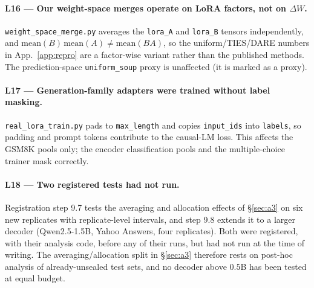 \documentclass[11pt]{article}
\begin{document}
\paragraph{L16 — Our weight-space merges operate on LoRA factors, not on $\Delta W$.} \texttt{weight\_\allowbreak space\_\allowbreak merge.\allowbreak py} averages the \texttt{lora\_A} and \texttt{lora\_B} tensors independently, and $\mathrm{mean}(B)\,\mathrm{mean}(A) \neq \mathrm{mean}(BA)$, so the uniform/TIES/DARE numbers in App.~\ref{app:repro} are a factor-wise variant rather than the published methods. The prediction-space \texttt{uniform\_soup} proxy is unaffected (it is marked as a proxy).

\paragraph{L17 — Generation-family adapters were trained without label masking.} \texttt{real\_\allowbreak lora\_\allowbreak train.\allowbreak py} pads to \texttt{max\_length} and copies \texttt{input\_ids} into \texttt{labels}, so padding and prompt tokens contribute to the causal-LM loss. This affects the GSM8K pools only; the encoder classification pools and the multiple-choice trainer mask correctly.

\paragraph{L18 — Two registered tests had not run.} Registration step 9.7 tests the averaging and allocation effects of \S\ref{sec:a3} on six new replicates with replicate-level intervals, and step 9.8 extends it to a larger decoder (Qwen2.5-1.5B, Yahoo Answers, four replicates). Both were registered, with their analysis code, before any of their runs, but had not run at the time of writing. The averaging/allocation split in \S\ref{sec:a3} therefore rests on post-hoc analysis of already-unsealed test sets, and no decoder above $0.5$B has been tested at equal budget.
\end{document}
